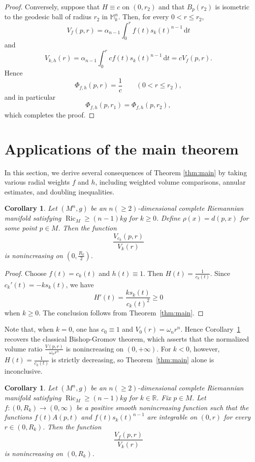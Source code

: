 \documentclass[11pt]{article}
\newtheorem{corollary}[theorem]{Corollary}
\newcommand{\Ric}{\operatorname{Ric}}
\newcommand{\dd}{\,\mathrm{d}}
\begin{document}
\begin{proof}
Conversely, suppose that \(H\equiv c\) on \((0,r_2)\) and that \(B_p(r_2)\) is isometric to the geodesic ball of radius $r_2$ in $\mathbb{M}_k^n$. Then, for every \(0<r\leq r_2\),
\[
V_f(p,r)
=
\alpha_{n-1}\int_0^r f(t)s_k(t)^{n-1}\dd t
\]
and
\[
V_{k,h}(r)
=
\alpha_{n-1}\int_0^r c f(t)s_k(t)^{n-1}\dd t
=
cV_f(p,r).
\]
Hence
\[
\Phi_{f,h}(p,r)=\frac1c
\qquad (0<r\leq r_2),
\]
and in particular
\[
\Phi_{f,h}(p,r_1)=\Phi_{f,h}(p,r_2),
\]
which completes the proof.


\end{proof}



\section{Applications of the main theorem}
In this section, we derive several consequences of Theorem \ref{thm:main} by taking various radial weights $f$ and $h$, including weighted volume comparisons, annular estimates, and doubling inequalities.

\begin{corollary}
\label{cor:ck}
Let $(M^n,g)$ be an $n(\geq 2)$-dimensional complete Riemannian manifold satisfying $\Ric_M\geq(n-1)kg$ for $k \geq0$. Define \(\rho(x)=d(p,x)\) for some point $p\in M$. Then the function
$$
\frac{V_{c_k}(p,r)}{V_k(r)}
$$
is nonincreasing on $\left(0,\frac{R_k}{2}\right)$.
\end{corollary}

\begin{proof}
Choose $f(t)=c_k(t)$ and $h(t)\equiv1$. Then $H(t)=\frac{1}{c_k(t)}$. Since $c_k'(t)=-ks_k(t)$, we have
\[
H'(t)
=
\frac{ks_k(t)}{c_k(t)^2}
\geq0
\]
when $k\geq0$. The conclusion follows from Theorem~\ref{thm:main}.
\end{proof}

Note that, when $k=0$, one has $c_0\equiv1$ and $V_0(r)=\omega_n r^n$. Hence Corollary~\ref{cor:ck} recovers the classical Bishop-Gromov theorem, which asserts that the normalized volume ratio $\frac{V(p,r)}{\omega_n r^n}$ is nonincreasing on $(0,+\infty)$. For $k<0$, however, $H(t)=\frac{1}{c_k(t)}$ is strictly decreasing, so Theorem~\ref{thm:main} alone is inconclusive.





\begin{corollary}
\label{cor:decreasing-f}
Let $(M^n,g)$ be an $n(\geq 2)$-dimensional complete Riemannian manifold satisfying $\Ric_M\geq(n-1)kg$ for $k \in \mathbb{R}$. Fix \(p\in M\). Let $f\colon(0,R_k)\rightarrow(0,\infty)$ be a positive smooth nonincreasing function such that the functions $f(t)A(p,t)$ and $f(t)s_k(t)^{n-1}$ are integrable on \((0,r)\) for every \(r\in(0,R_k)\). Then the function
$$
\frac{V_f(p,r)}{V_k(r)}
$$
is nonincreasing on \((0,R_k)\).
\end{corollary}
\end{document}

